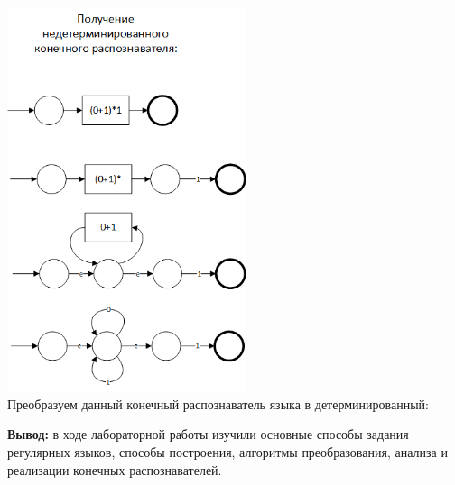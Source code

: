 \documentclass[a4paper,14pt]{extarticle}
\begin{document}
\begin{enumerate}[1.]
\includegraphics[width=70mm]{task2_non_determined}\\
Преобразуем данный конечный распознаватель языка в детерминированный:\\

\end{enumerate}

\textbf{Вывод: } в ходе лабораторной работы изучили основные способы задания регулярных языков, 
способы построения, алгоритмы преобразования, анализа и реализации конечных 
распознавателей.
\end{document}
